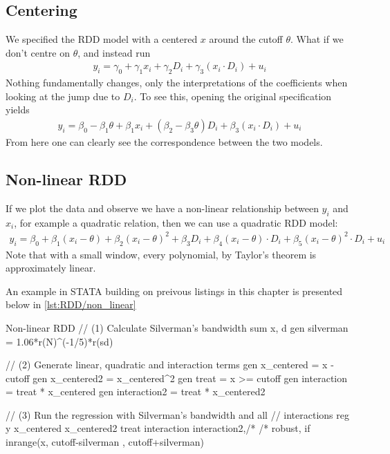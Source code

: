         \subsection{Centering}
            We specified the RDD model with a centered $x$ around the cutoff $\theta$. What if we don’t centre on $\theta$, and instead run
            \begin{align}
                y_i = \gamma_0 + \gamma_1 x_i + \gamma_2 D_i + \gamma_3 (x_i \cdot D_i) + u_i
            \end{align}
            Nothing fundamentally changes, only the interpretations of the coefficients when looking at the jump due to $D_i$. To see this, opening the original specification yields
            \begin{align}
                y_i = \beta_0 - \beta_1 \theta + \beta_1 x_i + (\beta_2 - \beta_3\theta) D_i + \beta_3 (x_i \cdot D_i) + u_i
            \end{align}
            From here one can clearly see the correspondence between the two models.

        \subsection{Non-linear RDD}
            If we plot the data and observe we have a non-linear relationship between $y_i$ and $x_i$, for example a quadratic relation, then we can use a quadratic RDD model:
            \begin{align}
                y_i = \beta_0 +\beta_1 (x_i- \theta) + \beta_2 (x_i-\theta)^2+ \beta_3 D_i + \beta_4 (x_i-\theta)\cdot D_i+\beta_5 (x_i - \theta)^2\cdot D_i + u_i
            \end{align}
            Note that with a small window, every polynomial, by Taylor’s theorem is approximately linear. 
	        
            An example in STATA building on preivous listings in this chapter is presented below in \ref{lst:RDD/non_linear}
            
            \begin{sexylisting}[colback=white, label=lst:RDD/non_linear]{Non-linear RDD}
//  (1) Calculate Silverman's bandwidth
    sum x, d
    gen silverman = 1.06*r(N)^(-1/5)*r(sd)

//  (2) Generate linear, quadratic and interaction terms
    gen x_centered = x -cutoff
    gen x_centered2 = x_centered^2
    gen treat = x >= cutoff
    gen interaction = treat * x_centered
    gen interaction2 = treat * x_centered2
    
//  (3) Run the regression with Silverman's bandwidth and all
//	interactions
    reg y x_centered x_centered2 treat interaction interaction2,/*
    /* robust, if inrange(x, cutoff-silverman , cutoff+silverman) 
            \end{sexylisting}
		
